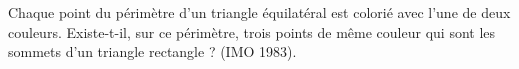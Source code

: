 Chaque point du périmètre d'un triangle équilatéral est colorié avec l'une de deux couleurs. Existe-t-il, sur ce périmètre, trois points de même couleur qui sont les sommets d'un triangle rectangle ? (IMO 1983).
